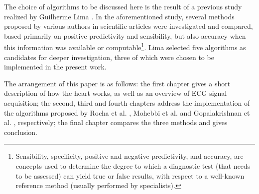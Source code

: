 The choice of algorithms to be discussed here is the result of a previous study realized by Guilherme Lima \cite{Lima01}. In the aforementioned study, several methods proposed by various authors in scientific articles were investigated and compared, based primarily on positive predictivity and sensibility, but also accuracy when this information was available or computable\footnote{Sensibility, specificity, positive and negative predictivity, and accuracy, are concepts used to determine the degree to which a diagnostic test (that needs to be assessed) can yield true or false results, with respect to a well-known reference method (usually performed by specialists).}. Lima selected five algorithms as candidates for deeper investigation, three of which were chosen to be implemented in the present work.

The arrangement of this paper is as follows: the first chapter gives a short description of how the heart works, as well as an overview of ECG signal acquisition; the second, third and fourth chapters address the implementation of the algorithms proposed by Rocha et al. \cite{Rocha10},  Mohebbi et al. \cite{Mohebbi07} and Gopalakrishnan et al. \cite{Gopalak04}, respectively; the final chapter compares the three methods and gives conclusion.
